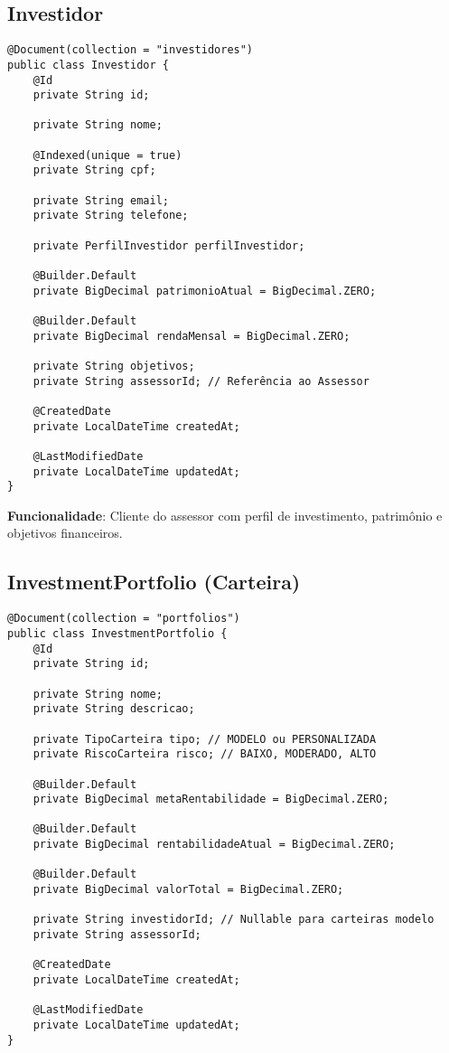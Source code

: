 \documentclass[12pt,a4paper]{article}
\begin{document}
\subsection{Investidor}

\begin{lstlisting}[caption=Modelo Investidor]
@Document(collection = "investidores")
public class Investidor {
    @Id
    private String id;
    
    private String nome;
    
    @Indexed(unique = true)
    private String cpf;
    
    private String email;
    private String telefone;
    
    private PerfilInvestidor perfilInvestidor;
    
    @Builder.Default
    private BigDecimal patrimonioAtual = BigDecimal.ZERO;
    
    @Builder.Default
    private BigDecimal rendaMensal = BigDecimal.ZERO;
    
    private String objetivos;
    private String assessorId; // Referência ao Assessor
    
    @CreatedDate
    private LocalDateTime createdAt;
    
    @LastModifiedDate
    private LocalDateTime updatedAt;
}
\end{lstlisting}

\textbf{Funcionalidade}: Cliente do assessor com perfil de investimento, patrimônio e objetivos financeiros.

\subsection{InvestmentPortfolio (Carteira)}

\begin{lstlisting}[caption=Modelo InvestmentPortfolio]
@Document(collection = "portfolios")
public class InvestmentPortfolio {
    @Id
    private String id;
    
    private String nome;
    private String descricao;
    
    private TipoCarteira tipo; // MODELO ou PERSONALIZADA
    private RiscoCarteira risco; // BAIXO, MODERADO, ALTO
    
    @Builder.Default
    private BigDecimal metaRentabilidade = BigDecimal.ZERO;
    
    @Builder.Default
    private BigDecimal rentabilidadeAtual = BigDecimal.ZERO;
    
    @Builder.Default
    private BigDecimal valorTotal = BigDecimal.ZERO;
    
    private String investidorId; // Nullable para carteiras modelo
    private String assessorId;
    
    @CreatedDate
    private LocalDateTime createdAt;
    
    @LastModifiedDate
    private LocalDateTime updatedAt;
}
\end{lstlisting}
\end{document}
